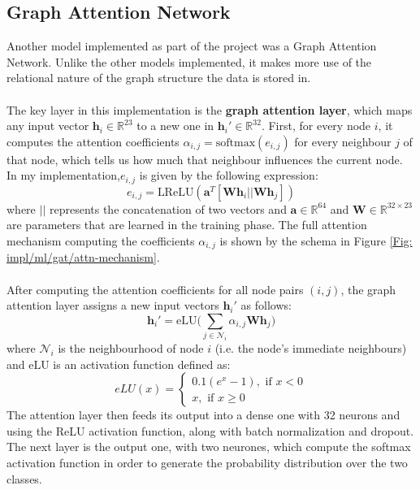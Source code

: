 	\subsection{Graph Attention Network} \label{Section: impl/ml/gat}
	Another model implemented as part of the project was a Graph Attention Network. Unlike the other models implemented, it makes more use of the relational nature of the graph structure the data is stored in. 
	\\ \\
	The key layer in this implementation is the \textbf{graph attention layer}, which maps any input vector $\mathbf{h}_i
	 \in \mathbb{R}^{23}$ to a new one in $\mathbf{h}_i'\in \mathbb{R}^{32}$. First, for every node $i$, it computes the attention coefficients $\alpha_{i,j} = \text{softmax}(e_{i,j})$ for every neighbour $j$ of that node, which tells us how much that neighbour influences the current node. In my implementation,$e_{i,j}$ is given by the following expression:
	\begin{equation}
		e_{i,j} = \text{LReLU}(\mathbf{a}^T[\mathbf{W}\mathbf{h}_i\vert\vert\mathbf{W}\mathbf{h}_j])
	\end{equation}
	where $\vert\vert$ represents the concatenation of two vectors and $\mathbf{a}\in\mathbb{R}^{64}$ and $\mathbf{W}\in\mathbb{R}^{32\times23}$ are parameters that are learned in the training phase. The full attention mechanism computing the coefficients $\alpha_{i,j}$ is shown by the schema in Figure \ref{Fig: impl/ml/gat/attn-mechanism}. 
	\\ \\
	After computing the attention coefficients for all node pairs $(i,j)$, the graph attention layer assigns a new input vectors $\mathbf{h}_i'$ as follows:
	\begin{equation}
		\mathbf{h}_i' = \text{eLU}\Bigg( \sum_{j \in \mathcal{N}_i} \alpha_{i,j} \mathbf{W} \mathbf{h}_j \Bigg)
	\end{equation}
	where $\mathcal{N}_i$ is the neighbourhood of node $i$ (i.e. the node's immediate neighbours) and $\text{eLU}$ is an activation function defined as:
	\begin{equation*}
		eLU(x) = 
			\begin{cases}
				0.1(e^x - 1), \text{ if } x < 0 \\
				x, \text{ if } x \geq 0
			\end{cases}
	\end{equation*}
	The attention layer then feeds its output into a dense one with 32 neurons and using the ReLU activation function, along with batch normalization and dropout. The next layer is the output one, with two neurones, which compute the softmax activation function in order to generate the probability distribution over the two classes.
